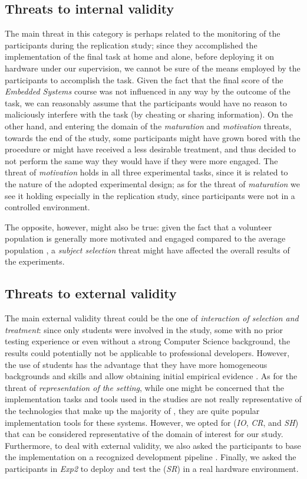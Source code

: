 \subsection{Threats to internal validity}
The main threat in this category is perhaps related to the monitoring of the participants during the replication study; since they accomplished the implementation of the final task at home and alone, before deploying it on hardware under our supervision, we cannot be sure of the means employed by the participants to accomplish the task. Given the fact that the final score of the \textit{Embedded Systems} course was not influenced in any way by the outcome of the task, we can reasonably assume that the participants would have no reason to maliciously interfere with the task (\ie by cheating or sharing information). On the other hand, and entering the domain of the \textit{maturation} and \textit{motivation} threats, towards the end of the study, some participants might have grown bored with the procedure or might have received a less desirable treatment, and thus decided to not perform the same way they would have if they were more engaged. The threat of \textit{motivation} holds in all three experimental tasks, since it is related to the nature of the adopted experimental design; as for the threat of \textit{maturation} we see it holding especially in the replication study, since participants were not in a controlled environment.

The opposite, however, might also be true: given the fact that a volunteer population is generally more motivated and engaged compared to the average population \cite{DBLP:books/sp/WohlinRHOR00}, a \textit{subject selection} threat might have affected the overall results of the experiments.

\subsection{Threats to external validity}
The main external validity threat could be the one of \textit{interaction of selection and treatment}: since only students were involved in the study, some with no prior testing experience or even without a strong Computer Science background, the results could potentially not be applicable to professional developers. 
However, the use of students has the advantage that they have more homogeneous backgrounds and skills and allow obtaining initial empirical evidence \cite{DBLP:conf/metrics/CarverJMS03, DBLP:journals/ese/HostRW00}.
As for the threat of \textit{representation of the setting}, while one might be concerned that the implementation tasks and tools used in the studies are not really representative of the technologies that make up the majority of \ess, they are quite popular implementation tools for these systems. 
However, we opted for \ess (\ie \textit{IO}, \textit{CR}, and \textit{SH}) that can be considered representative of the domain of interest for our study. Furthermore, to deal with external validity, we also asked the participants to base the \ess implementation on a recognized development pipeline \cite{TDDEC}. Finally, we asked the participants in \textit{Exp2} to deploy and test the \es (\ie \textit{SR}) in a real hardware environment.

